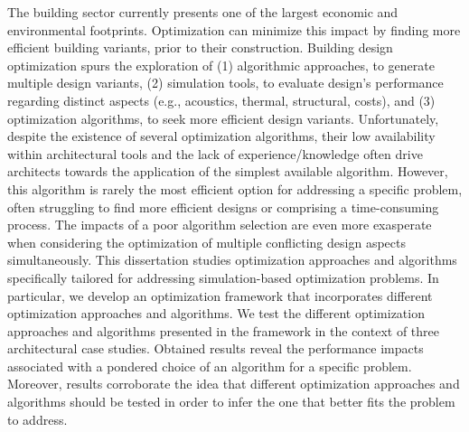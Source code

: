 \noindent 

The building sector currently presents one of the largest economic and environmental footprints. Optimization can minimize this impact by finding more efficient building variants, prior to their construction. Building design optimization spurs the exploration of (1) algorithmic approaches, to generate multiple design variants, (2) simulation tools, to evaluate design's performance regarding distinct aspects (e.g., acoustics, thermal, structural, costs), and (3) optimization algorithms, to seek more efficient design variants. Unfortunately, despite the existence of several optimization algorithms, their low availability within architectural tools and the lack of experience/knowledge often drive architects towards the application of the simplest available algorithm. However, this algorithm is rarely the most efficient option for addressing a specific problem, often struggling to find more efficient designs or comprising a time-consuming process. The impacts of a poor algorithm selection are even more exasperate when considering the optimization of multiple conflicting design aspects simultaneously. This dissertation studies optimization approaches and algorithms specifically tailored for addressing simulation-based optimization problems. In particular, we develop an optimization framework that incorporates different optimization approaches and algorithms. We test the different optimization approaches and algorithms presented in the framework in the context of three architectural case studies. Obtained results reveal the performance impacts associated with a pondered choice of an algorithm for a specific problem. Moreover, results corroborate the idea that different optimization approaches and algorithms should be tested in order to infer the one that better fits the problem to address. 
